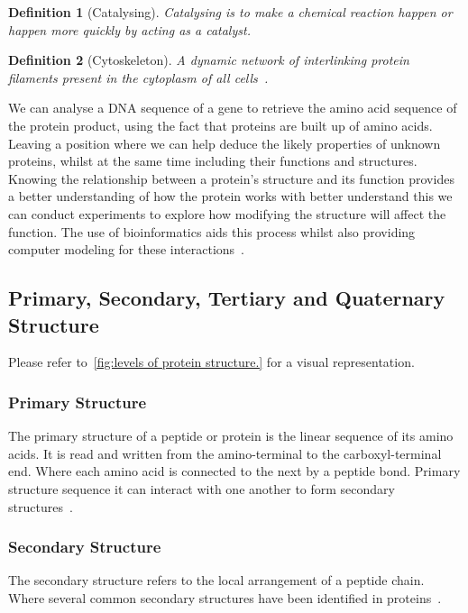 \documentclass{report}
\newtheorem{definition}{Definition}[section]
\begin{document}
\begin{definition}[Catalysing]
    Catalysing is to make a chemical reaction happen or happen more quickly by acting as a catalyst.
\end{definition}

\begin{definition}[Cytoskeleton]
    A dynamic network of interlinking protein filaments present in the cytoplasm of all cells~\cite{zvelebil_understanding_2008}. 
\end{definition}

We can analyse a DNA sequence of a gene to retrieve the amino acid sequence of the protein product, using the fact that proteins are built up of amino acids. Leaving a position where we can help deduce the likely properties of unknown proteins, whilst at the same time including their functions and structures. Knowing the relationship between a protein's structure and its function provides a better understanding of how the protein works with better understand this we can conduct experiments to explore how modifying the structure will affect the function. The use of bioinformatics aids this process whilst also providing computer modeling for these interactions~\cite{zvelebil_understanding_2008}.

\subsection{Primary, Secondary, Tertiary and Quaternary Structure}

Please refer to~\ref{fig:levels of protein structure.} for a visual representation.

\subsubsection{Primary Structure}

The primary structure of a peptide or protein is the linear sequence of its amino acids. It is read and written from the amino-terminal to the carboxyl-terminal end. Where each amino acid is connected to the next by a peptide bond. Primary structure sequence it can interact with one another to form secondary structures~\cite{sun_overview_2004}.

\subsubsection{Secondary Structure}

The secondary structure refers to the local arrangement of a peptide chain. Where several common secondary structures have been identified in proteins~\cite{sun_overview_2004}.
\end{document}
